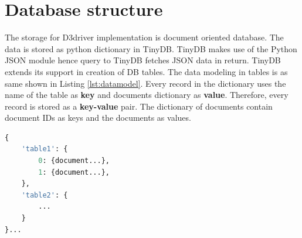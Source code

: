 \section{Database structure}
The storage for D3driver implementation is document oriented database. The data is stored as python dictionary in TinyDB. TinyDB makes use of the Python JSON module hence query to TinyDB fetches JSON data in return. TinyDB extends its support in creation of DB tables. The data modeling in tables is as same shown in Listing \ref{lst:datamodel}. Every record in the dictionary uses the name of the table as \textbf{key} and documents dictionary as \textbf{value}. Therefore, every record is stored as a \textbf{key-value} pair. The dictionary of documents contain document IDs as keys and the documents as values.

\begin{lstlisting}[caption={Data in TinyDB tables},label={lst:datamodel},language=python]
{
    'table1': {
        0: {document...},
        1: {document...},
    },
    'table2': {
        ...
    }
}...
\end{lstlisting}

